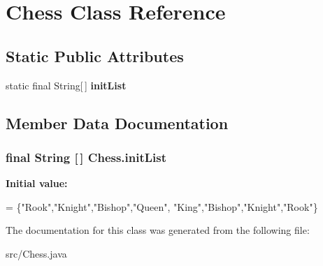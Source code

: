 \hypertarget{class_chess}{\section{Chess Class Reference}
\label{class_chess}
}
\subsection*{Static Public Attributes}
\begin{DoxyCompactItemize}
\item 
static final String\mbox{[}$\,$\mbox{]} {\bfseries init\-List}
\end{DoxyCompactItemize}


\subsection{Member Data Documentation}
\hypertarget{class_chess_a40e36ddfeea1126e7c4b9701d758d15b}{
\subsubsection[{init\-List}]{\setlength{\rightskip}{0pt plus 5cm}final String \mbox{[}$\,$\mbox{]} Chess.\-init\-List\hspace{0.3cm}{\ttfamily [static]}}}\label{class_chess_a40e36ddfeea1126e7c4b9701d758d15b}
{\bfseries Initial value\-:}
\begin{DoxyCode}
= \{\textcolor{stringliteral}{"Rook"},\textcolor{stringliteral}{"Knight"},\textcolor{stringliteral}{"Bishop"},\textcolor{stringliteral}{"Queen"},
                                              \textcolor{stringliteral}{"King"},\textcolor{stringliteral}{"Bishop"},\textcolor{stringliteral}{"Knight"},\textcolor{stringliteral}{"Rook"}\}
\end{DoxyCode}


The documentation for this class was generated from the following file\-:\begin{DoxyCompactItemize}
\item 
src/Chess.\-java\end{DoxyCompactItemize}
